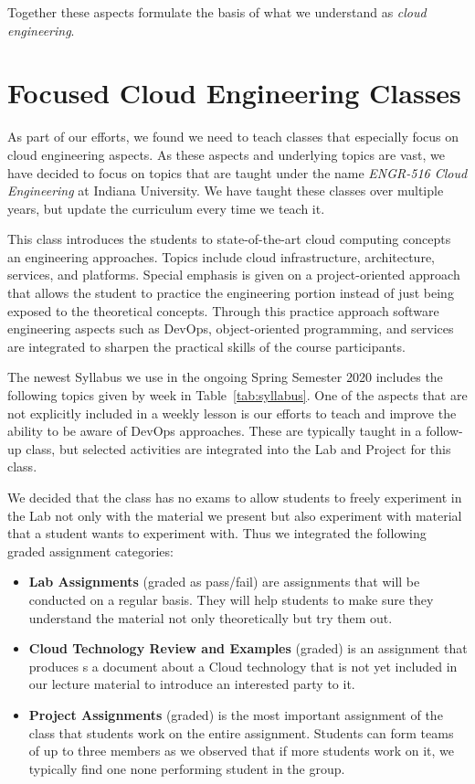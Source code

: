 \documentclass[conference]{IEEEtran}
\begin{document}
Together these aspects formulate the basis of what we understand as 
{\em cloud engineering}.

\section{Focused Cloud Engineering Classes}

As part of our efforts, we found we need to teach classes that especially focus on cloud engineering aspects. As these aspects and underlying topics are vast, we have decided to focus on topics that are taught under the name {\em ENGR-516 Cloud Engineering} at Indiana University. We have taught these classes over multiple years, but update the curriculum every time we teach it.

This class introduces the students to state-of-the-art cloud computing concepts an engineering approaches. Topics include cloud infrastructure, architecture, services, and platforms. Special emphasis is given on a project-oriented approach that allows the student to practice the engineering portion instead of just being exposed to the theoretical concepts. Through this practice approach software engineering aspects such as DevOps, object-oriented programming, and services are integrated to sharpen the practical skills of the course participants.

The newest Syllabus we use in the ongoing Spring Semester 2020 includes the following topics given by week in Table~\ref{tab:syllabus}.  One of the aspects that are not explicitly included in a weekly lesson is our efforts to teach and improve the ability to be aware of DevOps approaches. These are typically taught in a follow-up class, but selected activities are integrated into the Lab and Project for this class.

We decided that the class has no exams to allow students to freely experiment in the Lab not only with the material we present but also experiment with material that a student wants to experiment with. Thus we integrated the following graded assignment categories:

\begin{itemize}
  
\item {\bf Lab Assignments} (graded as pass/fail) are assignments that
  will be conducted on a regular basis. They will help students to
  make sure they understand the material not only theoretically but
  try them out.

\item {\bf Cloud Technology Review and Examples} (graded) is an
  assignment that produces s a document about a Cloud technology that
  is not yet included in our lecture material to introduce an
  interested party to it.
  
\item {\bf Project Assignments} (graded) is the most important
  assignment of the class that students work on the entire assignment. Students can form teams of up to three members as we
  observed that if more students work on it, we typically find one none
  performing student in the group.

\end{itemize}
\end{document}
